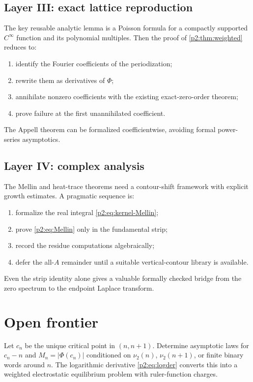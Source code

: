 \documentclass[11pt]{article}
\numberwithin{equation}{section}
\theoremstyle{definition}
\theoremstyle{remark}
\begin{document}
\subsection{Layer III: exact lattice reproduction}

The key reusable analytic lemma is a Poisson formula for a compactly supported
$C^\infty$ function and its polynomial multiples.  Then the proof of
\cref{p2:thm:weighted} reduces to:
\begin{enumerate}
\item identify the Fourier coefficients of the periodization;
\item rewrite them as derivatives of $\Phi$;
\item annihilate nonzero coefficients with the existing exact-zero-order theorem;
\item prove failure at the first unannihilated coefficient.
\end{enumerate}
The Appell theorem can be formalized coefficientwise, avoiding formal power-series
asymptotics.

\subsection{Layer IV: complex analysis}

The Mellin and heat-trace theorems need a contour-shift framework with explicit
growth estimates.  A pragmatic sequence is:
\begin{enumerate}
\item formalize the real integral \eqref{p2:eq:kernel-Mellin};
\item prove \eqref{p2:eq:Mellin} only in the fundamental strip;
\item record the residue computations algebraically;
\item defer the all-$A$ remainder until a suitable vertical-contour library is
      available.
\end{enumerate}
Even the strip identity alone gives a valuable formally checked bridge from the
zero spectrum to the endpoint Laplace transform.

\section{Open frontier}
\label{p2:sec:open}

\begin{problem}
Let $c_n$ be the unique critical point in $(n,n+1)$.  Determine asymptotic laws
for $c_n-n$ and $M_n=|\Phi(c_n)|$ conditioned on $\nu_2(n)$, $\nu_2(n+1)$, or
finite binary words around $n$.  The logarithmic derivative
\eqref{p2:eq:logder} converts this into a weighted electrostatic equilibrium problem
with ruler-function charges.
\end{problem}
\end{document}
